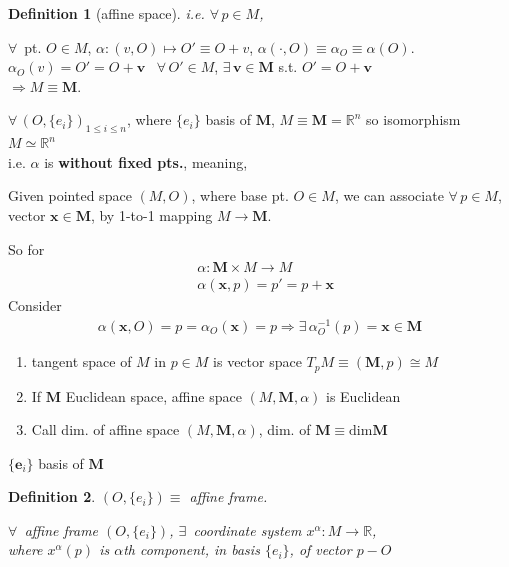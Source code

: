 \documentclass[10pt]{amsart}
\newtheorem{definition}{Definition}
\begin{document}
\begin{multicols*}{2}
\begin{definition}[affine space]
  i.e. $\forall \, p \in M$, 
  \end{definition}

$\forall \, $ pt. $O \in M$, $\alpha:(v,O) \mapsto O' \equiv O + v$, $\alpha (\cdot , O) \equiv \alpha_O \equiv \alpha(O)$.  $\alpha_O(v) = O' = O + \mathbf{v}$ \qquad \, $\forall \, O' \in M$, $\exists \, \mathbf{v} \in \mathbf{M}$ s.t. $O' = O + \mathbf{v}$ \\
$\Longrightarrow M \equiv \mathbf{M}$.

$\forall \, (O, \lbrace e_i \rbrace)_{1 \leq i \leq n }$, where $\lbrace e_i \rbrace$ basis of $\mathbf{M}$, $M \equiv \mathbf{M} = \mathbb{R}^n$ so isomorphism $M \simeq \mathbb{R}^n$ \\

i.e. $\alpha$ is \textbf{without fixed pts.}, meaning, 

Given pointed space $(M, O)$, where base pt. $O\in M$, we can associate $\forall \, p \in M$, vector $\mathbf{x} \in \mathbf{M}$, by 1-to-1 mapping $M\to \mathbf{M}$. 

So for 
\[
\begin{aligned}
& \alpha : \mathbf{M} \times M \to M \\ 
& \alpha(\mathbf{x}, p) = p' = p + \mathbf{x}
\end{aligned}
\]
Consider 
\[
\begin{gathered}
	\alpha(\mathbf{x}, O) = p = \alpha_O(\mathbf{x}) = p \Longrightarrow \exists \, \alpha_O^{-1}(p) = \mathbf{x} \in \mathbf{M}
\end{gathered}
\]

\begin{enumerate}
	\item tangent space of $M$ in $p\in M$ is vector space $T_pM \equiv (\mathbf{M}, p) \cong M$
	\item If $\mathbf{M}$ Euclidean space, affine space $(M, \mathbf{M}, \alpha)$ is Euclidean
	\item Call dim. of affine space $(M, \mathbf{M}, \alpha)$, dim. of $\mathbf{M} \equiv \text{dim}{\mathbf{M}}$
\end{enumerate}
$\lbrace \mathbf{e}_i \rbrace$ basis of $\mathbf{M}$




\begin{definition}
  $(O, \lbrace e_i \rbrace) \equiv $ affine frame.

  $\forall \, $ affine frame $(O,\lbrace e_i \rbrace)$, $\exists \, $ coordinate system $x^{\alpha} : M \to \mathbb{R}$, \\
  where $x^{\alpha}(p)$ is $\alpha$th component, in basis $\lbrace e_i \rbrace$, of vector $p-O$
  \end{definition}


\end{multicols*}
\end{document}
